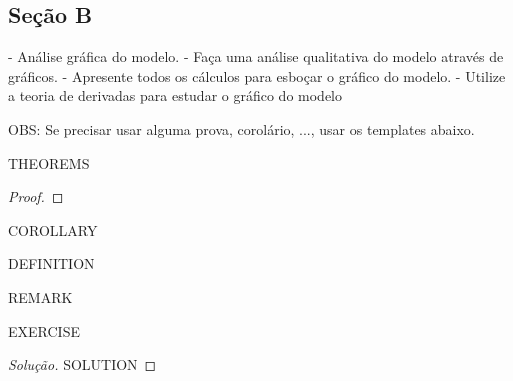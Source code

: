 \subsection{Seção B}

- Análise gráfica do modelo.
- Faça uma análise qualitativa do modelo através de gráficos. 
- Apresente todos os cálculos para esboçar o gráfico do modelo. 
- Utilize a teoria de derivadas para estudar o gráfico do modelo


OBS: Se precisar usar alguma prova, corolário, ..., usar os templates abaixo.

\begin{theorem}
THEOREMS
\end{theorem}
\begin{proof}
\end{proof}
\begin{corollary}
COROLLARY
\end{corollary}
\begin{definition}
DEFINITION
\end{definition}
\begin{remark}
REMARK
\end{remark}
\begin{exercise}
EXERCISE
\end{exercise}
\begin{proof}[Solução]
SOLUTION
\end{proof}
\clearpage